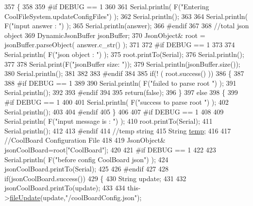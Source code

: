 \begin{DoxyCode}
357 \{
358 
359 \textcolor{preprocessor}{#if DEBUG == 1}
360 
361     Serial.println( F(\textcolor{stringliteral}{"Entering CoolFileSystem.updateConfigFiles"}) );
362     Serial.println();
363     
364     Serial.println( F(\textcolor{stringliteral}{"input answer : "}) );
365     Serial.println(answer);
366 \textcolor{preprocessor}{#endif}
367 
368     \textcolor{comment}{//total json object }
369     DynamicJsonBuffer jsonBuffer;
370     JsonObject& root = jsonBuffer.parseObject( answer.c\_str() );
371 
372 \textcolor{preprocessor}{#if DEBUG == 1}
373     
374     Serial.println( F(\textcolor{stringliteral}{"json object : "}) );  
375     root.printTo(Serial);
376     Serial.println();
377     
378     Serial.print(F(\textcolor{stringliteral}{"jsonBuffer size: "}));
379     Serial.println(jsonBuffer.size());
380     Serial.println();
381 
382 
383 \textcolor{preprocessor}{#endif}
384 
385     \textcolor{keywordflow}{if}(! ( root.success() ))
386     \{
387     
388 \textcolor{preprocessor}{    #if DEBUG == 1}
389 
390         Serial.println( F(\textcolor{stringliteral}{"failed to parse root "}) );
391         Serial.println();
392     
393 \textcolor{preprocessor}{    #endif}
394 
395         \textcolor{keywordflow}{return}(\textcolor{keyword}{false});
396     \}
397     \textcolor{keywordflow}{else}
398     \{
399 \textcolor{preprocessor}{    #if DEBUG == 1}
400         
401         Serial.println( F(\textcolor{stringliteral}{"success to parse root "}) );
402         Serial.println();
403         
404 \textcolor{preprocessor}{    #endif  }
405     \}
406     
407 \textcolor{preprocessor}{#if DEBUG == 1}
408 
409     Serial.println( F(\textcolor{stringliteral}{"input message is : "}) );
410     root.printTo(Serial);
411     Serial.println();
412 
413 \textcolor{preprocessor}{#endif}
414     \textcolor{comment}{//temp string}
415     String \hyperlink{_irene3000_8h_a5905d48604152cf57aa6bfa087b49173}{temp};
416 
417     \textcolor{comment}{//CoolBoard Configuration File}
418 
419         JsonObject& jsonCoolBoard=root[\textcolor{stringliteral}{"CoolBoard"}];
420 
421 \textcolor{preprocessor}{#if DEBUG == 1}
422 
423     Serial.println( F(\textcolor{stringliteral}{"before config CoolBoard json"}) );
424     jsonCoolBoard.printTo(Serial);
425 
426 \textcolor{preprocessor}{#endif}
427 
428     \textcolor{keywordflow}{if}(jsonCoolBoard.success())
429     \{
430         String update;
431     
432         jsonCoolBoard.printTo(update);
433 
434         this->\hyperlink{class_cool_file_system_a13f2958f5b87757c31fc53797a30d23a}{fileUpdate}(update,\textcolor{stringliteral}{"/coolBoardConfig.json"});     

\end{DoxyCode}
